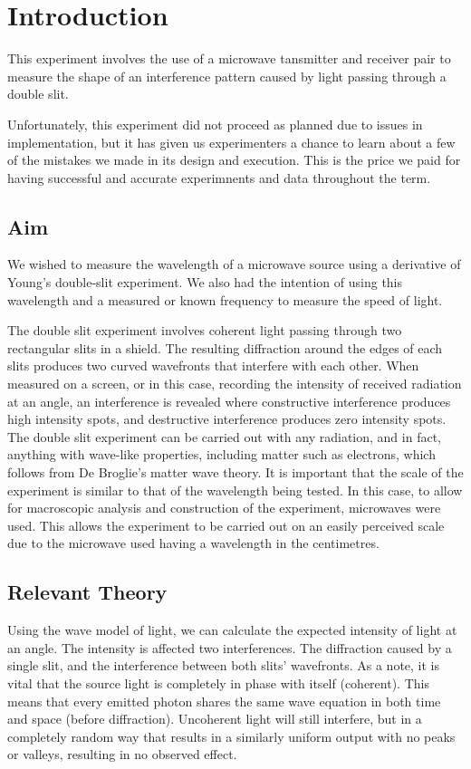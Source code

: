 \section*{Introduction}

This experiment involves the use of a microwave tansmitter and receiver pair to measure the shape of an interference pattern caused by light passing through a double slit.

Unfortunately, this experiment did not proceed as planned due to issues in implementation, but it has given us experimenters a chance to learn about a few of the mistakes we made in its design and execution. This is the price we paid for having successful and accurate experimnents and data throughout the term.

\subsection*{Aim}

We wished to measure the wavelength of a microwave source using a derivative of Young's double-slit experiment.
We also had the intention of using this wavelength and a measured or known frequency to measure the speed of light.

The double slit experiment involves coherent light passing through two rectangular slits in a shield. The resulting diffraction around the edges of each slits produces two curved wavefronts that interfere with each other. When measured on a screen, or in this case, recording the intensity of received radiation at an angle, an interference is revealed where constructive interference produces high intensity spots, and destructive interference produces zero intensity spots. The double slit experiment can be carried out with any radiation, and in fact, anything with wave-like properties, including matter such as electrons, which follows from De Broglie's matter wave theory. It is important that the scale of the experiment is similar to that of the wavelength being tested. In this case, to allow for macroscopic analysis and construction of the experiment, microwaves were used. This allows the experiment to be carried out on an easily perceived scale due to the microwave used having a wavelength in the centimetres.

\subsection*{Relevant Theory}
\label {sec:theory}

Using the wave model of light, we can calculate the expected intensity of light at an angle. The intensity is affected two interferences. The diffraction caused by a single slit, and the interference between both slits' wavefronts. As a note, it is vital that the source light is completely in phase with itself (coherent). This means that every emitted photon shares the same wave equation in both time and space (before diffraction). Uncoherent light will still interfere, but in a completely random way that results in a similarly uniform output with no peaks or valleys, resulting in no observed effect.

